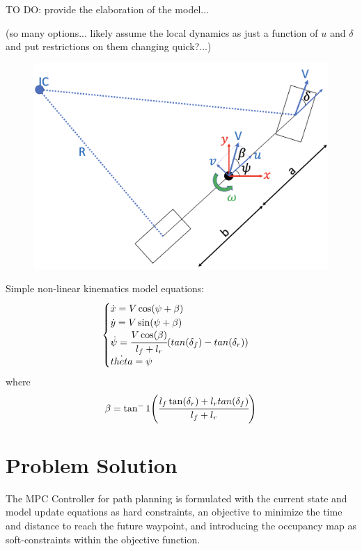 \documentclass[]{IEEEtran}
\begin{document}
TO DO: 
provide the elaboration of the model...

(so many options... likely assume the local dynamics as just a function of $u$ and $\delta$ and put restrictions on them changing quick?...)


\begin{figure}[h]
    \centering
    \includegraphics[width=\columnwidth]{figs/BicycleModel.png}
    \caption{}
    \label{fig:bikeModel_diagram}
\end{figure}

Simple non-linear kinematics model equations:
\begin{equation}
    \begin{cases}
        \dot{x} = V \cos(\psi + \beta)\\
        \dot{y} = V \sin(\psi + \beta)\\
        \dot{\psi} = \cfrac{V \cos(\beta)}{l_f + l_r} \qty(tan(\delta_f) - tan(\delta_r))\\
        \dot{theta} = \psi
    \end{cases}
\end{equation}
where
\begin{equation}
    \beta = \tan^-1\qty(\cfrac{l_f \tan(\delta_r) + l_r tan(\delta_f)}{l_f + l_r})
\end{equation}







\section{Problem Solution}
\label{sec:pblm_soln}
The MPC Controller for path planning is formulated with the current state and model update equations as hard constraints, an objective to minimize the time and distance to reach the future waypoint, and introducing the occupancy map as soft-constraints within the objective function.
\end{document}
